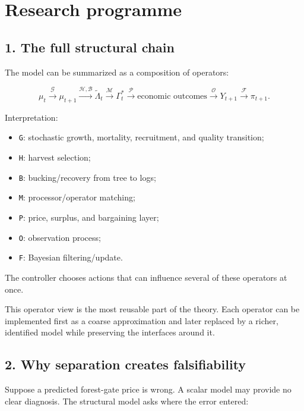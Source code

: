 \section{Research programme}\label{research-programme}

\subsection{1. The full structural chain}\label{the-full-structural-chain}

The model can be summarized as a composition of operators:

\[
\mu_t
\xrightarrow{\mathcal G}
\mu_{t+1}
\xrightarrow{\mathcal H,\mathcal B}
\widetilde\Lambda_t
\xrightarrow{\mathcal M}
\Gamma_t^*
\xrightarrow{\mathcal P}
\text{economic outcomes}
\xrightarrow{\mathcal O}
Y_{t+1}
\xrightarrow{\mathcal F}
\pi_{t+1}.
\]

Interpretation:

\begin{itemize}
\tightlist
\item
  \texttt{G}: stochastic growth, mortality, recruitment, and quality transition;
\item
  \texttt{H}: harvest selection;
\item
  \texttt{B}: bucking/recovery from tree to logs;
\item
  \texttt{M}: processor/operator matching;
\item
  \texttt{P}: price, surplus, and bargaining layer;
\item
  \texttt{O}: observation process;
\item
  \texttt{F}: Bayesian filtering/update.
\end{itemize}

The controller chooses actions that can influence several of these operators at
once.

This operator view is the most reusable part of the theory. Each operator can be
implemented first as a coarse approximation and later replaced by a richer,
identified model while preserving the interfaces around it.

\subsection{2. Why separation creates falsifiability}\label{why-separation-creates-falsifiability}

Suppose a predicted forest-gate price is wrong. A scalar model may provide no
clear diagnosis. The structural model asks where the error entered:


